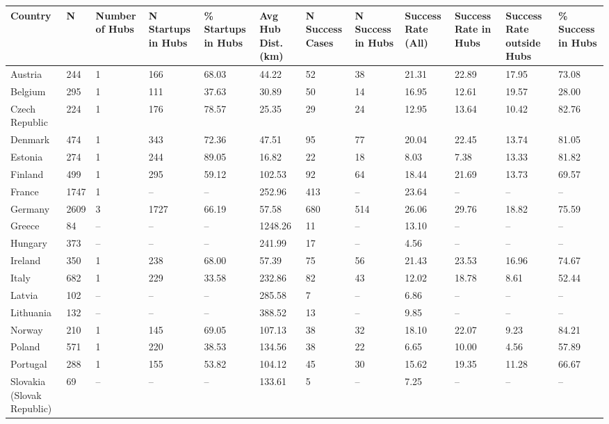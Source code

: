 \begin{tabular}{llllllllllll}
  \toprule
Country & N & Number of Hubs & N Startups in Hubs & \% Startups in Hubs & Avg Hub Dist. (km) & N Success Cases & N Success in Hubs & Success Rate (All) & Success Rate in Hubs & Success Rate outside Hubs & \% Success in Hubs \\ 
  \midrule
Austria & 244 & 1 & 166 & 68.03 & 44.22 & 52 & 38 & 21.31 & 22.89 & 17.95 & 73.08 \\ 
  Belgium & 295 & 1 & 111 & 37.63 & 30.89 & 50 & 14 & 16.95 & 12.61 & 19.57 & 28.00 \\ 
  Czech Republic & 224 & 1 & 176 & 78.57 & 25.35 & 29 & 24 & 12.95 & 13.64 & 10.42 & 82.76 \\ 
  Denmark & 474 & 1 & 343 & 72.36 & 47.51 & 95 & 77 & 20.04 & 22.45 & 13.74 & 81.05 \\ 
  Estonia & 274 & 1 & 244 & 89.05 & 16.82 & 22 & 18 & 8.03 & 7.38 & 13.33 & 81.82 \\ 
  Finland & 499 & 1 & 295 & 59.12 & 102.53 & 92 & 64 & 18.44 & 21.69 & 13.73 & 69.57 \\ 
  France & 1747 & 1 & – & – & 252.96 & 413 & – & 23.64 & – & – & – \\ 
  Germany & 2609 & 3 & 1727 & 66.19 & 57.58 & 680 & 514 & 26.06 & 29.76 & 18.82 & 75.59 \\ 
  Greece & 84 & – & – & – & 1248.26 & 11 & – & 13.10 & – & – & – \\ 
  Hungary & 373 & – & – & – & 241.99 & 17 & – & 4.56 & – & – & – \\ 
  Ireland & 350 & 1 & 238 & 68.00 & 57.39 & 75 & 56 & 21.43 & 23.53 & 16.96 & 74.67 \\ 
  Italy & 682 & 1 & 229 & 33.58 & 232.86 & 82 & 43 & 12.02 & 18.78 & 8.61 & 52.44 \\ 
  Latvia & 102 & – & – & – & 285.58 & 7 & – & 6.86 & – & – & – \\ 
  Lithuania & 132 & – & – & – & 388.52 & 13 & – & 9.85 & – & – & – \\ 
  Norway & 210 & 1 & 145 & 69.05 & 107.13 & 38 & 32 & 18.10 & 22.07 & 9.23 & 84.21 \\ 
  Poland & 571 & 1 & 220 & 38.53 & 134.56 & 38 & 22 & 6.65 & 10.00 & 4.56 & 57.89 \\ 
  Portugal & 288 & 1 & 155 & 53.82 & 104.12 & 45 & 30 & 15.62 & 19.35 & 11.28 & 66.67 \\ 
  Slovakia (Slovak Republic) & 69 & – & – & – & 133.61 & 5 & – & 7.25 & – & – & – \\ 

\end{tabular}
